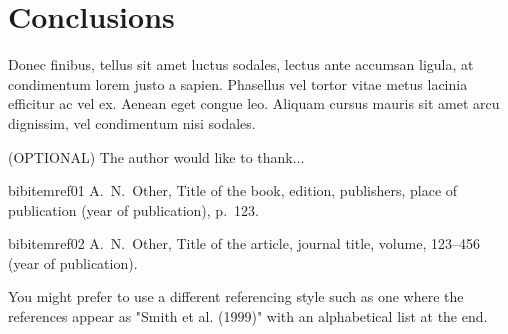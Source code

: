 \documentclass[12pt, twocolumn]{revtex4}    %
\begin{document}
\section{Conclusions}
Donec finibus, tellus sit amet luctus sodales, lectus ante accumsan ligula, at condimentum lorem justo a sapien. Phasellus vel tortor vitae metus lacinia efficitur ac vel ex. Aenean eget congue leo. Aliquam cursus mauris sit amet arcu dignissim, vel condimentum nisi sodales. 

\begin{acknowledgments}

(OPTIONAL) The author would like to thank...

\end{acknowledgments}

\begin{thebibliography}{}

bibitem{ref01} A.~N.~Other, Title of the book, edition, publishers, place of publication (year of publication), p.~123.   %

bibitem{ref02} A.~N.~Other, Title of the article, journal title, volume, 123--456 (year of publication).   %

 You might prefer to use a different referencing style such as one where the references appear as "Smith et al. (1999)" with an alphabetical list at the end.

\end{thebibliography} 
\end{document}

